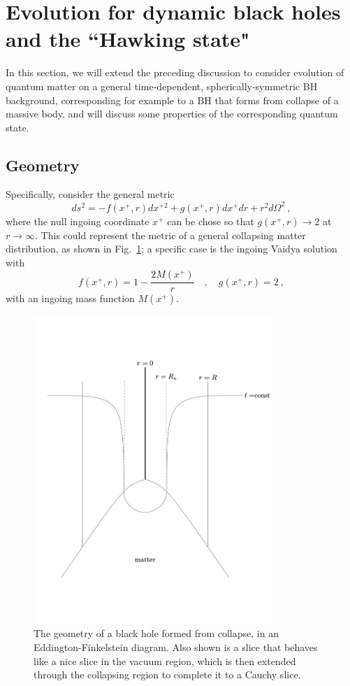 \documentclass[12pt]{article}
\numberwithin{equation}{section}
\newcommand{\beq}{\begin{equation}}
\newcommand{\eeq}{\end{equation}}
\begin{document}
\section{Evolution for dynamic black holes and the ``Hawking state"}
\label{BHevol}

In this section, we will extend the preceding discussion to consider evolution of quantum matter on a general time-dependent, spherically-symmetric BH background, corresponding for example to a BH that forms from collapse of a massive body, and will discuss some properties of the corresponding quantum state.  

\subsection{Geometry}


Specifically, consider the general metric
\beq\label{gmet}
ds^2 = -f(x^+,r) dx^{+2} + g(x^+,r) dx^+ dr + r^2 d\Omega^2\ ,
\eeq
where the null ingoing coordinate $x^+$ can be chose so that  $g(x^+,r)\rightarrow 2$ at $r\rightarrow\infty$.  This could represent the metric of a general collapsing matter distribution, as shown in Fig.~\ref{Collapse}; a specific case is the ingoing Vaidya solution with
\beq \label{fVaid}
f(x^+,r)= 1-\frac{2M(x^+)}{r}\quad,\quad g(x^+,r)=2\ ,
\eeq
with an ingoing mass function $M(x^+)$.

\begin{figure}[!hbtp] \begin{center}
\includegraphics[width=9cm]{fig2largetext.pdf}
\end{center}
\caption{The geometry of a black hole formed from collapse, in an Eddington-Finkelstein diagram.  Also shown is a slice that behaves like a nice slice in the vacuum region, which is then extended through  the collapsing region to complete it to a Cauchy slice.}
\label{Collapse}
\end{figure} 
\end{document}
